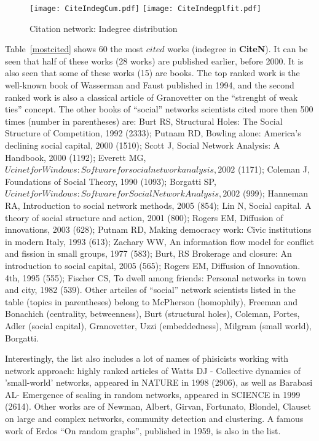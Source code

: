 \documentclass[11pt]{article} %
\begin{document}
\begin{figure}
\centerline{
\texttt{[image: CiteIndegCum.pdf]} \qquad
\texttt{[image: CiteIndegplfit.pdf]} }
\caption{Citation network: Indegree distribution}\label{cindeg}
\end{figure}
\medskip   

Table~\ref{mostcited} shows 60 the most $cited$ works (indegree in \textbf{CiteN}). It can be seen that half of these works (28 works) are published earlier, before 2000. It is also seen that some of these works (15) are books. The top ranked work is the well-known book of Wasserman and Faust published in 1994, and the second ranked work is also a classical article of Granovetter on the ``strenght of weak ties'' concept. The other books of  ``social'' networks scientists cited more then 500 times (number in parentheses) are:  Burt RS, Structural Holes: The Social Structure of Competition, 1992 (2333); Putnam RD, Bowling alone: America’s declining social capital, 2000 (1510); Scott J, Social Network Analysis: A Handbook, 2000 (1192); Everett MG, $Ucinet for Windows: Software for social network analysis, 2002$ (1171); Coleman J, Foundations of Social Theory, 1990 (1093); Borgatti SP,  $Ucinet for Windows: Software for Social Network Analysis, 2002$ (999); Hanneman RA, Introduction to social network methods, 2005 (854); Lin N, Social capital. A theory of social structure and action, 2001 (800); Rogers EM, Diffusion of innovations, 2003 (628); Putnam RD, Making democracy work: Civic institutions in modern Italy, 1993 (613); Zachary WW, An information flow model for conflict and fission in small groups, 1977 (583); Burt, RS	Brokerage and closure: An introduction to social capital, 2005 (565);  Rogers EM, Diffusion of Innovation. 4th, 1995 (555);  Fischer CS, To dwell among friends: Personal networks in town and city, 1982 (539). Other artciles of ``social'' network scientists listed in the table (topics in parentheses) belong to McPherson (homophily), Freeman and Bonachich (centrality, betweenness), Burt (structural holes), Coleman, Portes, Adler (social capital), Granovetter, Uzzi (embeddedness), Milgram (small world), Borgatti. \medskip 

Interestingly, the list also includes a lot of names of phisicists working with network approach: highly ranked articles of Watts DJ - Collective dynamics of 'small-world' networks, appeared in NATURE in 1998 (2906), as well as Barabasi AL-  Emergence of scaling in random networks, appeared in SCIENCE	in 1999 (2614). Other works are of Newman, Albert, Girvan, Fortunato, Blondel, Clauset on large and complex networks, community detection and clustering. A famous work of Erdos ``On random graphs'', published in 1959, is also in the list. \medskip 
\end{document}
